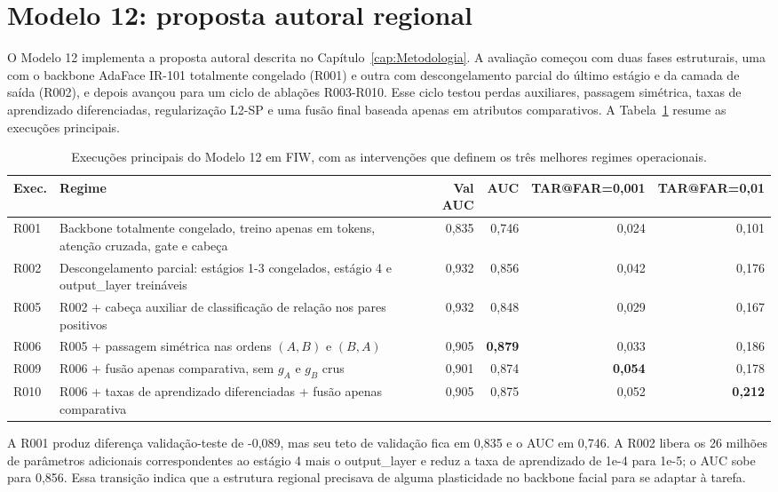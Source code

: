 \section{Modelo 12: proposta autoral regional}

O Modelo 12 implementa a proposta autoral descrita no Capítulo~\ref{cap:Metodologia}. A avaliação começou com duas fases estruturais, uma com o backbone AdaFace IR-101 totalmente congelado (R001) e outra com descongelamento parcial do último estágio e da camada de saída (R002), e depois avançou para um ciclo de ablações R003-R010. Esse ciclo testou perdas auxiliares, passagem simétrica, taxas de aprendizado diferenciadas, regularização L2-SP e uma fusão final baseada apenas em atributos comparativos. A Tabela~\ref{tab:m12_runs} resume as execuções principais.

\begin{table}[h]
\centering
\caption{Execuções principais do Modelo 12 em FIW, com as intervenções que definem os três melhores regimes operacionais.}
\label{tab:m12_runs}
\begin{tabular}{lp{6.2cm}rrrr}
\hline
\textbf{Exec.} & \textbf{Regime} & \textbf{Val AUC} & \textbf{AUC} & \textbf{TAR@FAR=0,001} & \textbf{TAR@FAR=0,01} \\
\hline
R001 & Backbone totalmente congelado, treino apenas em tokens, atenção cruzada, gate e cabeça & 0{,}835 & 0{,}746 & 0{,}024 & 0{,}101 \\
R002 & Descongelamento parcial: estágios 1-3 congelados, estágio 4 e output\_layer treináveis & 0{,}932 & 0{,}856 & 0{,}042 & 0{,}176 \\
R005 & R002 + cabeça auxiliar de classificação de relação nos pares positivos & 0{,}932 & 0{,}848 & 0{,}029 & 0{,}167 \\
R006 & R005 + passagem simétrica nas ordens $(A,B)$ e $(B,A)$ & 0{,}905 & \textbf{0{,}879} & 0{,}033 & 0{,}186 \\
R009 & R006 + fusão apenas comparativa, sem $g_A$ e $g_B$ crus & 0{,}901 & 0{,}874 & \textbf{0{,}054} & 0{,}178 \\
R010 & R006 + taxas de aprendizado diferenciadas + fusão apenas comparativa & 0{,}905 & 0{,}875 & 0{,}052 & \textbf{0{,}212} \\
\hline
\end{tabular}
\end{table}

A R001 produz diferença validação-teste de -0,089, mas seu teto de validação fica em 0,835 e o AUC em 0,746. A R002 libera os 26 milhões de parâmetros adicionais correspondentes ao estágio 4 mais o output\_layer e reduz a taxa de aprendizado de 1e-4 para 1e-5; o AUC sobe para 0,856. Essa transição indica que a estrutura regional precisava de alguma plasticidade no backbone facial para se adaptar à tarefa.

